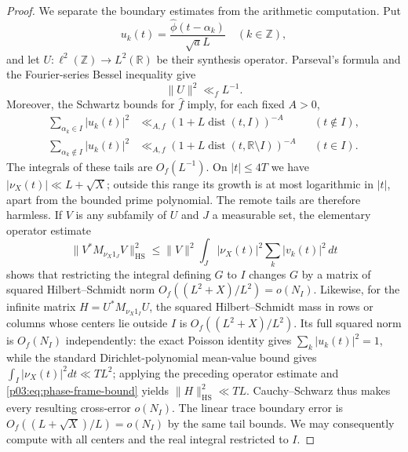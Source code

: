 \documentclass[11pt,letterpaper]{article}
\theoremstyle{definition}
\theoremstyle{remark}
\newcommand{\R}{\mathbb R}
\newcommand{\Z}{\mathbb Z}
\newcommand{\1}{\mathbf 1}
\begin{document}
\begin{proof}
We separate the boundary estimates from the arithmetic computation.
Put
\[
 u_k(t)=\frac{\widehat\phi(t-\alpha_k)}{\sqrt a L}
 \quad(k\in\Z),
\]
and let $U:\ell^2(\Z)\longrightarrow L^2(\R)$ be their synthesis
operator. Parseval's formula and the Fourier-series Bessel inequality
give
\begin{equation}\label{p03:eq:phase-frame-bound}
 \|U\|^2\ll_f L^{-1}.
\end{equation}
Moreover, the Schwartz bounds for $\widehat f$ imply, for each fixed
$A>0$,
\begin{align}
 \sum_{\alpha_k\in I}|u_k(t)|^2
   &\ll_{A,f}(1+L\operatorname{dist}(t,I))^{-A}
                      &&(t\notin I),\label{p03:eq:phase-frame-tail1}\\
 \sum_{\alpha_k\notin I}|u_k(t)|^2
   &\ll_{A,f}(1+L\operatorname{dist}(t,\R\setminus I))^{-A}
                      &&(t\in I).\label{p03:eq:phase-frame-tail2}
\end{align}
The integrals of these tails are $O_f(L^{-1})$. On $|t|\le4T$ we
have $|\nu_X(t)|\ll L+\sqrt X$; outside this range its growth is at
most logarithmic in $|t|$, apart from the bounded prime polynomial.
The remote tails are therefore harmless. If $V$ is any subfamily of
$U$ and $J$ a measurable set, the elementary operator estimate
\[
 \|V^*M_{\nu_X1_J}V\|_{\mathrm{HS}}^2
 \le \|V\|^2\int_J|\nu_X(t)|^2\sum_k|v_k(t)|^2\,dt
\]
shows that restricting the integral defining $G$ to $I$ changes $G$
by a matrix of squared Hilbert--Schmidt norm
$O_f((L^2+X)/L^2)=o(N_I)$. Likewise, for the infinite matrix
$H=U^*M_{\nu_X1_I}U$, the squared Hilbert--Schmidt mass in rows or
columns whose centers lie outside $I$ is
$O_f((L^2+X)/L^2)$. Its full squared norm is $O_f(N_I)$ independently: the exact
Poisson identity gives $\sum_k|u_k(t)|^2=1$, while the standard
Dirichlet-polynomial mean-value bound gives
$\int_I|\nu_X(t)|^2dt\ll TL^2$; applying the preceding operator
estimate and \eqref{p03:eq:phase-frame-bound} yields
$\|H\|_{\mathrm{HS}}^2\ll TL$. Cauchy--Schwarz thus makes every
resulting cross-error $o(N_I)$. The linear trace boundary error is
$O_f((L+\sqrt X)/L)=o(N_I)$ by the same tail bounds. We may consequently
compute with all centers and the real integral restricted to $I$.


\end{proof}
\end{document}

